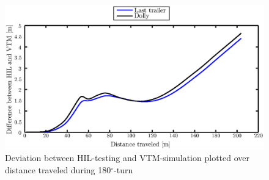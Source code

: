 \documentclass[ExampleMasters.tex]{subfiles}
\begin{document}
\begin{figure}[!htb]
	\centering
	\includegraphics[width=1\linewidth]{figures/compare_HIL_VTS}
	\caption{Deviation between \acrlong{HIL}-testing and \acrshort{VTM}-simulation plotted over distance traveled during 180$^\circ$-turn}
	
	\label{fig:compare_HIL_VTS}
\end{figure}
\end{document}
